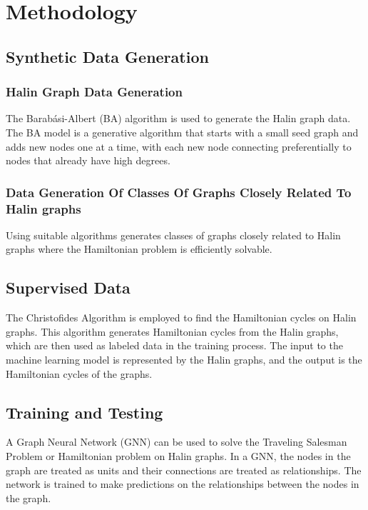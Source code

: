 \documentclass{article}
\begin{document}
\section{Methodology}
\subsection{Synthetic Data Generation}
\subsubsection{Halin Graph Data Generation}
The Barabási-Albert (BA) algorithm is used to generate the Halin graph data. The BA model is a generative algorithm that starts with a small seed graph and adds new nodes one at a time, with each new node connecting preferentially to nodes that already have high degrees.

\subsubsection{ Data Generation Of Classes Of  Graphs Closely Related To Halin graphs  }
Using suitable algorithms generates classes of graphs closely related to Halin graphs where the Hamiltonian problem is efficiently solvable. %
\subsection{Supervised Data}
The Christofides Algorithm is employed to find the Hamiltonian cycles on Halin graphs. This algorithm generates Hamiltonian cycles from the Halin graphs, which are then used as labeled data in the training process. The input to the machine learning model is represented by the Halin graphs, and the output is the Hamiltonian cycles of the graphs.
\subsection{Training and Testing}
A Graph Neural Network (GNN) can be used to solve the Traveling Salesman Problem or Hamiltonian problem on Halin graphs. In a GNN, the nodes in the graph are treated as units and their connections are treated as relationships. The network is trained to make predictions on the relationships between the nodes in the graph.
\end{document}
